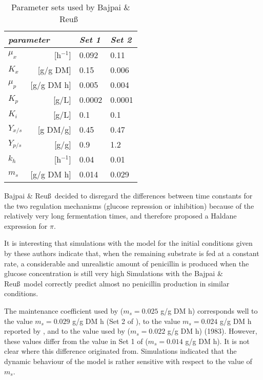 \documentclass{kluwer}    %
\begin{document}
\begin{article}
\begin{table} 
\caption[]{Parameter sets used by Bajpai \& Reu\ss\ } 
\begin{tabular}{lrll}                                       
\hline
\multicolumn{2}{l}{\it parameter} & {\it Set 1} & {\it Set 2}\\ 
\hline  
$\mu_{x}$           & [h$^{-1}$]  & 0.092       & 0.11          \\
$K_{x}$             & [g/g DM]     & 0.15        & 0.006         \\
$\mu_{p}$           & [g/g DM h]  & 0.005       & 0.004         \\
$K_{p}$             & [g/L]        & 0.0002      & 0.0001        \\
$K_{i}$             & [g/L]        & 0.1         & 0.1           \\
$Y_{x/s}$           & [g DM/g]     & 0.45        & 0.47          \\
$Y_{p/s}$           & [g/g]        & 0.9         & 1.2           \\
$k_{h}$             & [h$^{-1}$]  & 0.04        & 0.01          \\
$m_{s}$             & [g/g DM h]  & 0.014       & 0.029         \\ 
\hline
\end{tabular}
\end{table}
       
Bajpai \& Reu\ss\ decided to disregard the
differences between time constants for the two regulation mechanisms
(glucose repression or inhibition) because of the
relatively very long fermentation times, and therefore proposed a Haldane
expression for $\pi$.

It is interesting that simulations with the \cite{Bunt} model for the
initial conditions given by these authors indicate that, when the
remaining substrate is fed at a constant rate, a considerable and 
unrealistic amount of penicillin is 
produced when the glucose concentration is still very high \cite{CarberryCL88}
Simulations with the Bajpai \& Reu\ss\ model correctly predict almost        
no penicillin production in similar conditions.


The maintenance coefficient used by \cite{Bunt} 
($m_{s}=0.025$ g/g DM h) corresponds well to
the value $m_{s}=0.029$ g/g DM h (Set 2 of \cite{BuchananRBES}), to the 
value $m_{s}=0.024$ g/g DM h reported by \citeauthor{MMI2-d3}, and to the
value used by  ($m_{s}=0.022$ g/g DM h) (1983).
However, these values differ from the value in Set 1 of 
\cite{BuchananRBES} ($m_{s}=0.014$ g/g DM h). 
It is not clear where this difference originated from.
Simulations indicated that the dynamic behaviour of the model is rather
sensitive with respect to the value of $m_{s}$.


\end{article}
\end{document}
